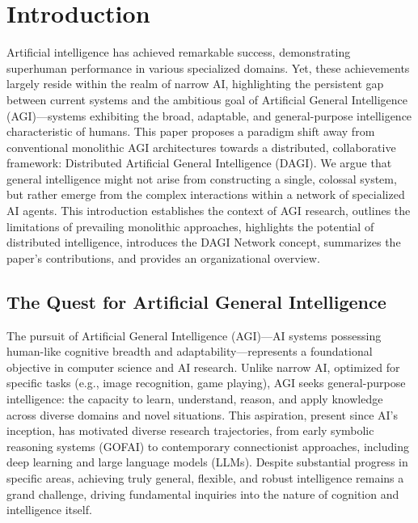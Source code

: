 \documentclass[12pt]{amsart}
\begin{document}
\section{Introduction}
\label{sec:introduction}
Artificial intelligence has achieved remarkable success, demonstrating superhuman performance in various specialized domains. Yet, these achievements largely reside within the realm of narrow AI, highlighting the persistent gap between current systems and the ambitious goal of Artificial General Intelligence (AGI)—systems exhibiting the broad, adaptable, and general-purpose intelligence characteristic of humans. This paper proposes a paradigm shift away from conventional monolithic AGI architectures towards a distributed, collaborative framework: Distributed Artificial General Intelligence (DAGI). We argue that general intelligence might not arise from constructing a single, colossal system, but rather emerge from the complex interactions within a network of specialized AI agents. This introduction establishes the context of AGI research, outlines the limitations of prevailing monolithic approaches, highlights the potential of distributed intelligence, introduces the DAGI Network concept, summarizes the paper's contributions, and provides an organizational overview.

\subsection{The Quest for Artificial General Intelligence}
The pursuit of Artificial General Intelligence (AGI)—AI systems possessing human-like cognitive breadth and adaptability—represents a foundational objective in computer science and AI research. Unlike narrow AI, optimized for specific tasks (e.g., image recognition, game playing), AGI seeks general-purpose intelligence: the capacity to learn, understand, reason, and apply knowledge across diverse domains and novel situations. This aspiration, present since AI's inception, has motivated diverse research trajectories, from early symbolic reasoning systems (GOFAI) to contemporary connectionist approaches, including deep learning and large language models (LLMs). Despite substantial progress in specific areas, achieving truly general, flexible, and robust intelligence remains a grand challenge, driving fundamental inquiries into the nature of cognition and intelligence itself.
\end{document}
